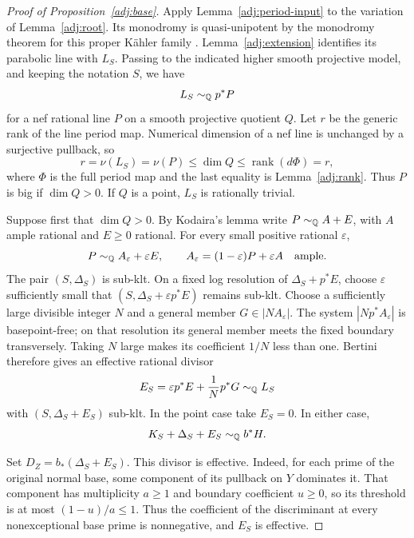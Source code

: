 \begin{proof}[Proof of Proposition~\ref{adj:base}]
Apply Lemma~\ref{adj:period-input} to the variation of
Lemma~\ref{adj:root}.  Its monodromy is quasi-unipotent by the monodromy
theorem for this proper K\"ahler family \cite{Schmid}.  Lemma~\ref{adj:extension}
identifies its parabolic line with $L_S$.  Passing to the indicated
higher smooth projective model, and keeping the notation $S$, we have
\[
                         L_S\sim_{\mathbb Q} p^*P
\]
for a nef rational line $P$ on a smooth projective quotient $Q$.
Let $r$ be the generic rank of the line period map.  Numerical dimension
of a nef line is unchanged by a surjective pullback, so
\[
 r=\nu(L_S)=\nu(P)\leq\dim Q
       \leq\operatorname{rank}(d\Phi)=r,
\]
where $\Phi$ is the full period map and the last equality is
Lemma~\ref{adj:rank}.  Thus $P$ is big if $\dim Q>0$.  If $Q$ is a point,
$L_S$ is rationally trivial.

Suppose first that $\dim Q>0$.  By Kodaira's lemma write
$P\sim_{\mathbb Q} A+E$, with $A$ ample rational and $E\geq0$ rational.  For every
small positive rational $\varepsilon$,
\begin{equation}
\label{adj:small-fixed-part}
 P\sim_{\mathbb Q} A_\varepsilon+\varepsilon E,
 \qquad A_\varepsilon=(1-\varepsilon)P+\varepsilon A
                 \quad\text{ample}.
\end{equation}
The pair $(S,\Delta_S)$ is sub-klt.  On a fixed log resolution of
$\Delta_S+p^*E$, choose $\varepsilon$ sufficiently small that
$(S,\Delta_S+\varepsilon p^*E)$ remains sub-klt.  Choose a sufficiently
large divisible integer $N$ and a general member
$G\in|N A_\varepsilon|$.  The system $|Np^*A_\varepsilon|$ is
basepoint-free; on that resolution its general member meets the fixed
boundary transversely.  Taking $N$ large makes its coefficient $1/N$
less than one.  Bertini therefore gives an effective rational divisor
\[
                    E_S=\varepsilon p^*E+\frac1N p^*G
                    \sim_{\mathbb Q} L_S
\]
with $(S,\Delta_S+E_S)$ sub-klt.  In the point case take $E_S=0$.
In either case,
\begin{equation}
\label{adj:upstairs-presentation}
                 K_S+\Delta_S+E_S\sim_{\mathbb Q} b^*H.
\end{equation}

Set $D_Z=b_*(\Delta_S+E_S)$.  This divisor is effective.  Indeed, for
each prime of the original normal base, some component of its pullback
on $Y$ dominates it.  That component has multiplicity $a\geq1$ and
boundary coefficient $u\geq0$, so its threshold is at most
$(1-u)/a\leq1$.  Thus the coefficient of the discriminant at every
nonexceptional base prime is nonnegative, and $E_S$ is effective.


\end{proof}
